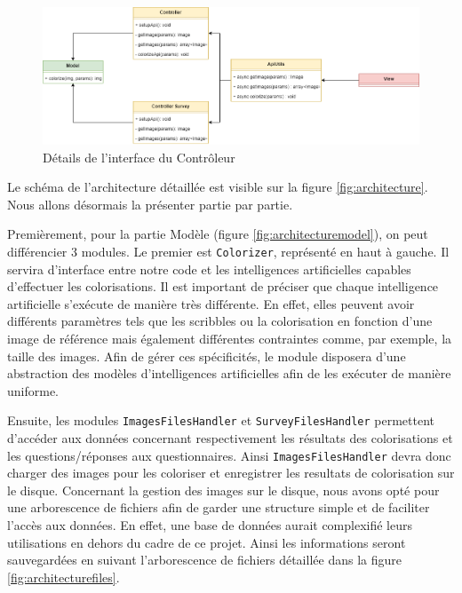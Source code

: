 \documentclass{article}
\begin{document}
\begin{figure}[!h]
    \centering
    \includegraphics[width=14cm]{code-architecture-controller.png}
    \caption{Détails de l'interface du Contrôleur}
    \label{fig:architecturecontroller}
\end{figure}

Le schéma de l'architecture détaillée est visible sur la figure \ref{fig:architecture}. Nous allons désormais la présenter partie par partie.

Premièrement, pour la partie Modèle (figure \ref{fig:architecturemodel}), on peut différencier 3 modules.
Le premier est \texttt{Colorizer}, représenté en haut à gauche.
Il servira d'interface entre notre code et les intelligences artificielles capables d'effectuer les colorisations. 
Il est important de préciser que chaque intelligence artificielle s'exécute de manière très différente. 
En effet, elles peuvent avoir différents paramètres tels que les scribbles ou la colorisation en fonction d'une image de référence mais également différentes contraintes comme, par exemple, la taille des images. 
Afin de gérer ces spécificités, le module disposera d'une abstraction des modèles d'intelligences artificielles afin de les exécuter de manière uniforme.

Ensuite, les modules \texttt{ImagesFilesHandler} et \texttt{SurveyFilesHandler} permettent d'accéder aux données concernant respectivement les résultats des colorisations et les questions/réponses aux questionnaires.
Ainsi \texttt{ImagesFilesHandler} devra donc charger des images pour les coloriser et enregistrer les resultats de colorisation sur le disque.
Concernant la gestion des images sur le disque, nous avons opté pour une arborescence de fichiers afin de garder une structure simple et de faciliter l'accès aux données.
En effet, une base de données aurait complexifié leurs utilisations en dehors du cadre de ce projet.
Ainsi les informations seront sauvegardées en suivant l'arborescence de fichiers détaillée dans la figure \ref{fig:architecturefiles}.
\end{document}
